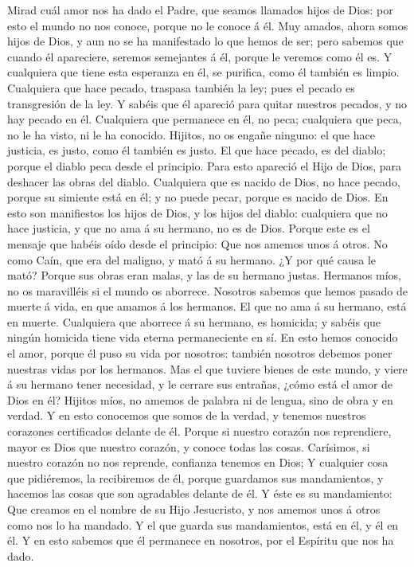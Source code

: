  Mirad cuál amor nos ha dado el Padre, que seamos llamados
hijos de Dios: por esto el mundo no nos conoce, porque no le conoce á
él.  Muy amados, ahora somos hijos de Dios, y aun no se ha
manifestado lo que hemos de ser; pero sabemos que cuando él apareciere,
seremos semejantes á él, porque le veremos como él es.  Y
cualquiera que tiene esta esperanza en él, se purifica, como él también
es limpio.  Cualquiera que hace pecado, traspasa también
la ley; pues el pecado es transgresión de la ley.  Y
sabéis que él apareció para quitar nuestros pecados, y no hay pecado en
él.  Cualquiera que permanece en él, no peca; cualquiera
que peca, no le ha visto, ni le ha conocido.  Hijitos, no
os engañe ninguno: el que hace justicia, es justo, como él también es
justo.  El que hace pecado, es del diablo; porque el
diablo peca desde el principio. Para esto apareció el Hijo de Dios, para
deshacer las obras del diablo.  Cualquiera que es nacido
de Dios, no hace pecado, porque su simiente está en él; y no puede
pecar, porque es nacido de Dios.  En esto son manifiestos
los hijos de Dios, y los hijos del diablo: cualquiera que no hace
justicia, y que no ama á su hermano, no es de Dios. 
Porque este es el mensaje que habéis oído desde el principio: Que nos
amemos unos á otros.  No como Caín, que era del maligno,
y mató á su hermano. ¿Y por qué causa le mató? Porque sus obras eran
malas, y las de su hermano justas.  Hermanos míos, no os
maravilléis si el mundo os aborrece.  Nosotros sabemos
que hemos pasado de muerte á vida, en que amamos á los hermanos. El que
no ama á su hermano, está en muerte.  Cualquiera que
aborrece á su hermano, es homicida; y sabéis que ningún homicida tiene
vida eterna permaneciente en sí.  En esto hemos conocido
el amor, porque él puso su vida por nosotros: también nosotros debemos
poner nuestras vidas por los hermanos.  Mas el que
tuviere bienes de este mundo, y viere á su hermano tener necesidad, y le
cerrare sus entrañas, ¿cómo está el amor de Dios en él? 
Hijitos míos, no amemos de palabra ni de lengua, sino de obra y en
verdad.  Y en esto conocemos que somos de la verdad, y
tenemos nuestros corazones certificados delante de él. 
Porque si nuestro corazón nos reprendiere, mayor es Dios que nuestro
corazón, y conoce todas las cosas.  Carísimos, si nuestro
corazón no nos reprende, confianza tenemos en Dios;  Y
cualquier cosa que pidiéremos, la recibiremos de él, porque guardamos
sus mandamientos, y hacemos las cosas que son agradables delante de él.
 Y éste es su mandamiento: Que creamos en el nombre de su
Hijo Jesucristo, y nos amemos unos á otros como nos lo ha mandado.
 Y el que guarda sus mandamientos, está en él, y él en
él. Y en esto sabemos que él permanece en nosotros, por el Espíritu que
nos ha dado.

